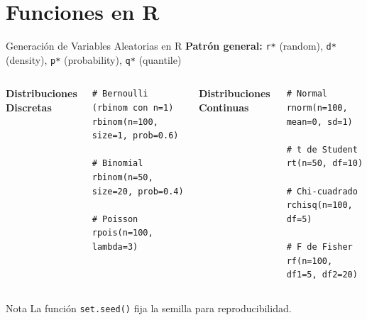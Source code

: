 \documentclass[aspectratio=169,11pt]{beamer}
\begin{document}
\section{Funciones en R}

\begin{frame}[fragile]{Generación de Variables Aleatorias en R}
\textbf{Patrón general:} \texttt{r*} (random), \texttt{d*} (density), \texttt{p*} (probability), \texttt{q*} (quantile)

\pause
\vspace{0.2cm}
\begin{columns}[T]
\textbf{Distribuciones Discretas}
\begin{lstlisting}
# Bernoulli (rbinom con n=1)
rbinom(n=100, size=1, prob=0.6)

# Binomial
rbinom(n=50, size=20, prob=0.4)

# Poisson
rpois(n=100, lambda=3)
\end{lstlisting}

\textbf{Distribuciones Continuas}
\begin{lstlisting}
# Normal
rnorm(n=100, mean=0, sd=1)

# t de Student
rt(n=50, df=10)

# Chi-cuadrado
rchisq(n=100, df=5)

# F de Fisher
rf(n=100, df1=5, df2=20)
\end{lstlisting}
\end{columns}

\pause
\vspace{0.3cm}
\begin{block}{Nota}
La función \texttt{set.seed()} fija la semilla para reproducibilidad.
\end{block}
\end{frame}
\end{document}
